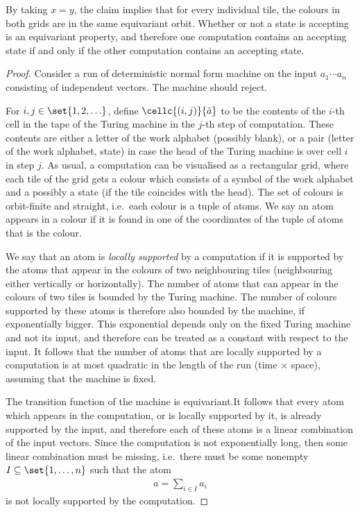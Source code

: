 By taking $x=y$, the claim implies that for every individual tile, the colours in both grids are in the same equivariant orbit. Whether or not a state is accepting is an equivariant property, and therefore one computation contains an accepting state if and only if the other computation contains an accepting state.


\begin{proof}
Consider a run of deterministic normal form machine on the input $a_1 \cdots a_n$ consisting of independent vectors. The machine should reject. 

For $i,j \in \set{1,2,\ldots}$, define $\cellc {(i,j)} {\bar a}$
to be the contents of the $i$-th cell in the tape of the Turing machine in the $j$-th step of computation. These contents are either a letter of the work alphabet (possibly blank), or a pair (letter of the work alphabet, state) in case the head of the Turing machine is over cell $i$ in step $j$. 
As usual, a computation can be visualised as a rectangular grid, where each tile of the grid gets a colour which consists of a symbol of the work alphabet and a possibly a state (if the tile coincides with the head). The set of colours is orbit-finite and straight, i.e.~each colour is a tuple of atoms. We say an atom appears in a colour if it is found in one of the coordinates of the tuple of atoms that is the colour.

We say that an atom is \emph{locally supported} by a computation if it is supported by the atoms that appear in the colours of two neighbouring tiles (neighbouring either vertically or horizontally). The number of atoms that can appear in the colours of two tiles is bounded by the Turing machine. The number of colours supported by these atoms is therefore also bounded by the machine, if exponentially bigger. This exponential depends only on the fixed Turing machine and not its input, and therefore can be treated as a constant with respect to the input. It follows that the number of atoms that are locally supported by a computation is at most quadratic in the length of the run (time $\times$ space), assuming that the machine is fixed.

The transition function of the machine is equivariant.It follows that every atom which appears in the computation, or is locally supported by it, is already supported by the input, and therefore each of these atoms is a linear combination of the input vectors. Since the computation is not exponentially long, then some linear combination must be missing, i.e.~there must be some nonempty $I \subseteq \set{1,\ldots,n}$ such that the atom
\begin{align*}
a = 		\sum_{i \in I} a_i
\end{align*}
is not locally supported by the computation. 



\end{proof}
